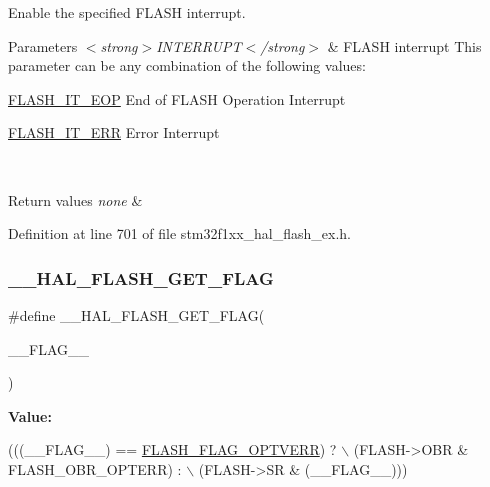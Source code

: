 Enable the specified F\+L\+A\+SH interrupt. 


\begin{DoxyParams}{Parameters}
{\em $<$strong$>$\+I\+N\+T\+E\+R\+R\+U\+P\+T$<$/strong$>$} & F\+L\+A\+SH interrupt This parameter can be any combination of the following values\+: \begin{DoxyItemize}
\item \hyperlink{group___f_l_a_s_h___interrupt__definition_gaea20e80e1806d58a7544cfe8659e7f11}{F\+L\+A\+S\+H\+\_\+\+I\+T\+\_\+\+E\+OP} End of F\+L\+A\+SH Operation Interrupt \item \hyperlink{group___f_l_a_s_h___interrupt__definition_ga4e2c23ab8c1b9a5ee49bf6d695d9ae8c}{F\+L\+A\+S\+H\+\_\+\+I\+T\+\_\+\+E\+RR} Error Interrupt \end{DoxyItemize}
\\
\hline
\end{DoxyParams}

\begin{DoxyRetVals}{Return values}
{\em none} & \\
\hline
\end{DoxyRetVals}


Definition at line 701 of file stm32f1xx\+\_\+hal\+\_\+flash\+\_\+ex.\+h.

\mbox{\label{group___f_l_a_s_h___interrupt_ga0d3dd161fecc0e47c9e109c7c28672c1}} 
\subsubsection{\texorpdfstring{\+\_\+\+\_\+\+H\+A\+L\+\_\+\+F\+L\+A\+S\+H\+\_\+\+G\+E\+T\+\_\+\+F\+L\+AG}{\_\_HAL\_FLASH\_GET\_FLAG}}
{\footnotesize\ttfamily \#define \+\_\+\+\_\+\+H\+A\+L\+\_\+\+F\+L\+A\+S\+H\+\_\+\+G\+E\+T\+\_\+\+F\+L\+AG(\begin{DoxyParamCaption}\item[{}]{\+\_\+\+\_\+\+F\+L\+A\+G\+\_\+\+\_\+ }\end{DoxyParamCaption})}

{\bfseries Value\+:}
\begin{DoxyCode}
(((\_\_FLAG\_\_) == \hyperlink{group___f_l_a_s_h___flag__definition_gacb2c4c991a260c3f110cd8c72f302864}{FLASH\_FLAG\_OPTVERR}) ? \(\backslash\)
                                            (FLASH->OBR & FLASH\_OBR\_OPTERR) : \(\backslash\)
                                            (FLASH->SR & (\_\_FLAG\_\_)))
\end{DoxyCode}


